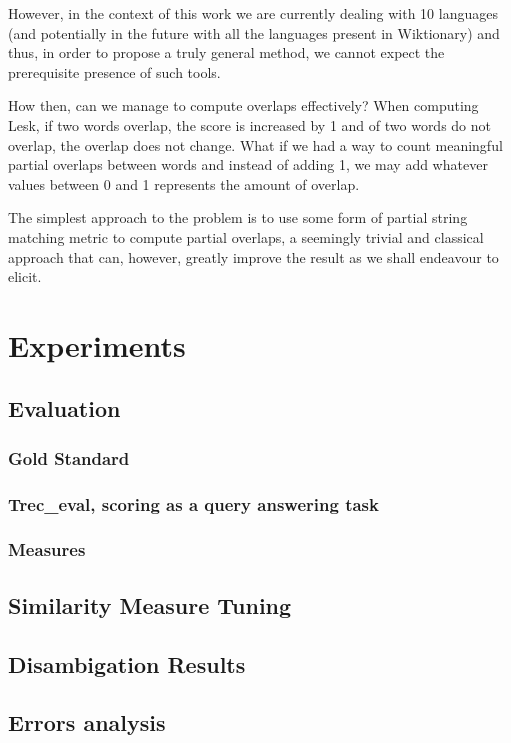\documentclass[10pt, a4paper]{article}
\begin{document}
However, in the context of this work we are currently dealing with 10 languages (and potentially in the future with all the languages present in Wiktionary) and thus, in order to propose a truly general method, we cannot expect the prerequisite presence of such tools. 

How then, can we manage to compute overlaps effectively? When computing Lesk, if two words overlap, the score is increased by 1 and of two words do not overlap, the overlap does not change. What if we had a way to count meaningful partial overlaps between words and instead of adding 1, we may add whatever values between 0 and 1 represents the amount of overlap.

The simplest approach to the problem is to use some form of partial string matching metric to compute partial overlaps, a seemingly trivial and classical approach that can, however, greatly improve the result as we shall endeavour to elicit. 



\section{Experiments}
\label{sec:expe}
\subsection{Evaluation}
\subsubsection{Gold Standard}
\subsubsection{Trec\_eval, scoring as a query answering task}
\subsubsection{Measures}
\subsection{Similarity Measure Tuning}
\subsection{Disambigation Results}
\subsection{Errors analysis}
\end{document}
